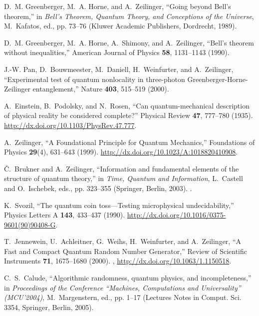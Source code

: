 \documentclass[pra,amsfonts,preprint,showkeys]{revtex4}
\begin{document}
\begin{thebibliography}{10}
D.~M. Greenberger, M.~A. Horne, and A.~Zeilinger, \enquote{Going beyond Bell's
  theorem,} in \emph{Bell's Theorem, Quantum Theory, and Conceptions of the
  {U}niverse}, M.~Kafatos, ed., pp. 73--76 (Kluwer Academic Publishers,
  Dordrecht, 1989).

D.~M. Greenberger, M.~A. Horne, A.~Shimony, and A.~Zeilinger, \enquote{{B}ell's
  theorem without inequalities,} American Journal of Physics \textbf{58},
  1131--1143 (1990).

J.-W. Pan, D.~Bouwmeester, M.~Daniell, H.~Weinfurter, and A.~Zeilinger,
  \enquote{Experimental test of quantum nonlocality in three-photon
  {G}reenberger-{H}orne-{Z}eilinger entanglement,} Nature \textbf{403},
  515--519 (2000).

A.~Einstein, B.~Podolsky, and N.~Rosen, \enquote{Can quantum-mechanical
  description of physical reality be considered complete?} Physical Review
  \textbf{47}, 777--780 (1935).
  \urlprefix\url{http://dx.doi.org/10.1103/PhysRev.47.777}.

A.~Zeilinger, \enquote{A Foundational Principle for Quantum Mechanics,}
  Foundations of Physics \textbf{29}(4), 631--643 (1999).
  \urlprefix\url{http://dx.doi.org/10.1023/A:1018820410908}.

{\v{C}}.~Brukner and A.~Zeilinger, \enquote{Information and fundamental
  elements of the structure of quantum theory,} in \emph{Time, Quantum and
  Information}, L.~Castell and O.~Ischebek, eds., pp. 323--355 (Springer,
  Berlin, 2003). .

K.~Svozil, \enquote{The quantum coin toss---Testing microphysical
  undecidability,} Physics Letters A \textbf{143}, 433--437 (1990).
  \urlprefix\url{http://dx.doi.org/10.1016/0375-9601(90)90408-G}.

T.~Jennewein, U.~Achleitner, G.~Weihs, H.~Weinfurter, and A.~Zeilinger,
  \enquote{A Fast and Compact Quantum Random Number Generator,} Review of
  Scientific Instruments \textbf{71}, 1675--1680 (2000).
  ,
  \urlprefix\url{http://dx.doi.org/10.1063/1.1150518}.

C.~S.~Calude, \enquote{{A}lgorithmic randomness, quantum physics, and
  incompleteness,} in \emph{Proceedings of the Conference ``Machines,
  Computations and Universality'' (MCU'2004)}, M.~Margenstern, ed., pp. 1--17
  (Lectures Notes in Comput. Sci. 3354, Springer, Berlin, 2005).


\end{thebibliography}
\end{document}
